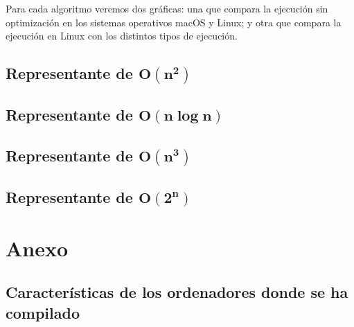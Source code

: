 \documentclass[11pt]{article}
\begin{document}
Para cada algoritmo veremos dos gráficas: una que compara la ejecución sin optimización en los sistemas operativos macOS y Linux; y otra que compara la ejecución en Linux con los distintos tipos de ejecución.

\subsection*{Representante de $\boldsymbol{O(n^2)}$}
	\begin{center}
		
	\end{center}

	\begin{center}
		
	\end{center}

\subsection*{Representante de $\boldsymbol{O(n\log n)}$}
	\begin{center}
		
	\end{center}

	\begin{center}
		
	\end{center}

\subsection*{Representante de $\boldsymbol{O(n^3)}$}
	\begin{center}
		
	\end{center}

	\begin{center}
		
	\end{center}

\subsection*{Representante de $\boldsymbol{O(2^n)}$}
	\begin{center}
		
	\end{center}

	\begin{center}
		
	\end{center}


\section*{Anexo}
\subsection*{Características de los ordenadores donde se ha compilado}
\end{document}
